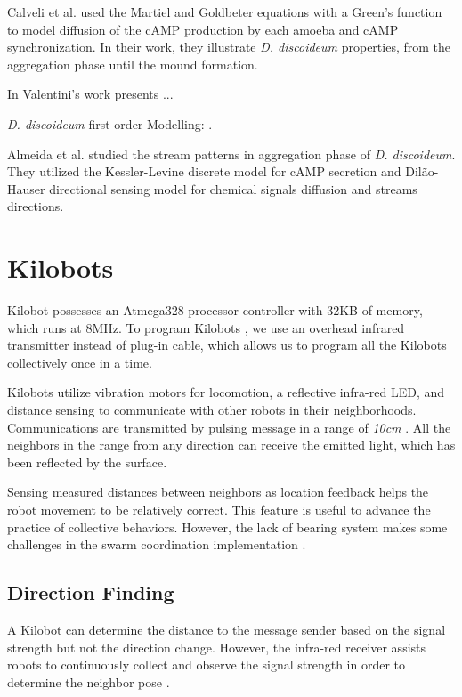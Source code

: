 \documentclass[11pt,a4paper]{article}
\begin{document}
Calveli et al. \cite{calovi2010camp} used the Martiel and Goldbeter equations \cite{martiel1987model} with a Green's function to model  diffusion of the cAMP production by each amoeba and cAMP synchronization.  In their work, they illustrate \textit{D. discoideum} properties, from the aggregation phase until the mound formation.


In Valentini's work \cite{ValentiniGabrieleHeikoHamann2015} %
presents ... 

\textit{D. discoideum} first-order Modelling: \cite{palsson2000model, dallon2006mathematically, maree2000pattern}.

 Almeida et al. \cite{almeida2016directional} studied the stream patterns in aggregation phase of \textit{D. discoideum}. They utilized the Kessler-Levine discrete model \cite{kessler1993pattern} for cAMP secretion and Dilão-Hauser directional sensing model \cite{dilao2013chemotaxis} for chemical signals  diffusion and streams directions.
\section {Kilobots} 
Kilobot possesses an Atmega328 processor controller with 32KB of memory, which runs at 8MHz. To program Kilobots \cite{Nagpal2012}, we use an overhead infrared transmitter instead of plug-in cable, which allows us to program all the Kilobots collectively once in a time.

Kilobots utilize vibration motors for locomotion, a reflective infra-red LED, and distance sensing to communicate with other robots in their neighborhoods. Communications are transmitted by pulsing message in a range of \textit{10cm}  \cite{Nagpal2012}. All the neighbors in the range from any direction can receive the emitted light, which has been reflected by the surface. 

Sensing measured distances between neighbors as location feedback helps the robot movement to be relatively correct. This feature is useful to advance the practice of collective behaviors. However, the lack of bearing system makes some challenges in the swarm coordination implementation \cite{griffith2016evolutionary}. 




\subsection{Direction Finding}
A Kilobot can determine the distance to the message sender based on the signal strength but not the direction change. However, the infra-red receiver assists robots to continuously collect and observe the signal strength in order to determine the neighbor pose \cite{griffith2016evolutionary}.
\end{document}
